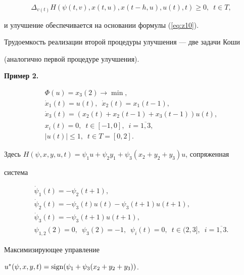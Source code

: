 $$


\Delta_{v(t)}H(\psi(t,v),x(t,u),x(t-h,u),u(t),t)\geq 0,\ \;t\in T,


$$


и улучшение обеспечивается на основании формулы (\ref{eq:z10}).





Трудоемкость реализации второй процедуры улучшения --- две задачи Коши


(аналогично первой процедуре улучшения).


\medskip





{\bf Пример 2.}


\begin{gather*}


\Phi(u)=x_3(2)\to \min,\\


\Dot{x}_1(t)=u(t),\ \;\Dot{x}_2(t)=x_1(t-1),\\


\Dot{x}_3(t)=(x_2(t)+x_2(t-1)+x_3(t-1))u(t),\\


x_i(t)=0,\ \;t\in [-1,0],\ \;i=\overline{1,3},\\


|u(t)|\leq 1,\ \;t\in T=[0,2].


\end{gather*}


Здесь $H(\psi,x,y,u,t)=\psi_1 u+\psi_2 y_1+\psi_3(x_2+y_2+y_3)u$, сопряженная


система


\begin{gather*}


\Dot{\psi}_1(t)=-\psi_2(t+1),\\


\Dot{\psi}_2(t)=-\psi_3(t)u(t)-\psi_3(t+1)u(t+1),\\


\Dot{\psi}_3(t)=-\psi_3(t+1)u(t+1),\\


\psi_{1,2}(2)=0,\ \;\psi_3(2)=-1, \ \;


\psi_i(t)=0, \ \;t\in (2,3],\ \;i=\overline{1,3}.


\end{gather*}


Максимизирующее управление


$u^*(\psi,x,y,t)=\operatorname{sign}(\psi_1+\psi_3(x_2+y_2+y_3))$.





